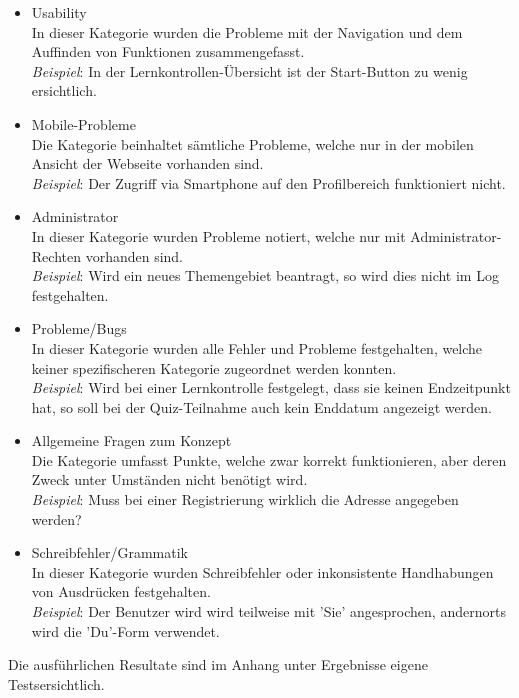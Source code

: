 \begin{itemize}
		
		\item Usability \\
		In dieser Kategorie wurden die Probleme mit der Navigation und dem Auffinden von Funktionen zusammengefasst. \\
		\textit{Beispiel}: In der Lernkontrollen-Übersicht ist der Start-Button zu wenig ersichtlich.
		\item Mobile-Probleme \\
		Die Kategorie beinhaltet sämtliche Probleme, welche nur in der mobilen Ansicht der Webseite vorhanden sind. \\
		\textit{Beispiel}: Der Zugriff via Smartphone auf den Profilbereich funktioniert nicht.
		\item Administrator \\
		In dieser Kategorie wurden Probleme notiert, welche nur mit Administrator-Rechten vorhanden sind. \\
		\textit{Beispiel}: Wird ein neues Themengebiet beantragt, so wird dies nicht im Log festgehalten.
		\item Probleme/Bugs \\
		In dieser Kategorie wurden alle Fehler und Probleme festgehalten, welche keiner spezifischeren Kategorie zugeordnet werden konnten. \\
		\textit{Beispiel}: Wird bei einer Lernkontrolle festgelegt, dass sie keinen Endzeitpunkt hat, so soll bei der Quiz-Teilnahme auch kein Enddatum angezeigt werden.
		\item Allgemeine Fragen zum Konzept \\
		Die Kategorie umfasst Punkte, welche zwar korrekt funktionieren, aber deren Zweck unter Umständen nicht benötigt wird. \\
		\textit{Beispiel}: Muss bei einer Registrierung wirklich die Adresse angegeben werden?
		\item Schreibfehler/Grammatik \\
		In dieser Kategorie wurden Schreibfehler oder inkonsistente Handhabungen von Ausdrücken festgehalten. \\
		\textit{Beispiel}: Der Benutzer wird wird teilweise mit 'Sie' angesprochen, andernorts wird die 'Du'-Form verwendet.
	\end{itemize}

	Die ausführlichen Resultate sind im Anhang unter \glqq Ergebnisse eigene Tests\grqq ersichtlich.	


